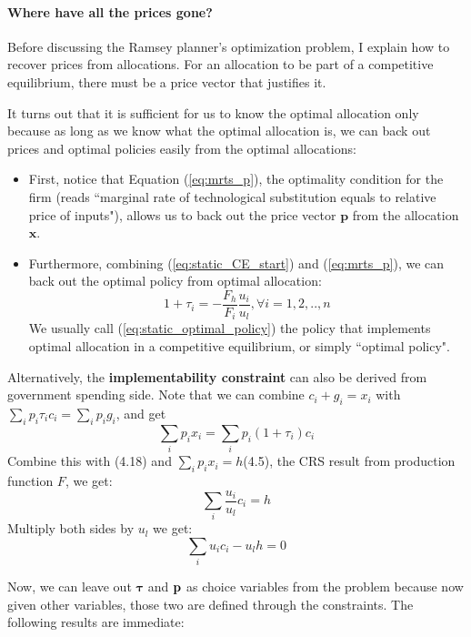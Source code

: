 \documentclass[12pt]{article}
\begin{document}
\paragraph{Where have all the prices gone?}
Before discussing the Ramsey planner's optimization problem, I explain how to recover prices from allocations. For an allocation to be part of a competitive equilibrium, there must be a price vector that justifies it. 

It turns out that it is sufficient for us to know the optimal allocation only because as long as we know what the optimal allocation is, we can back out prices and optimal policies easily from the optimal allocations:
\begin{itemize}
	\item First, notice that Equation (\ref{eq:mrts_p}), the optimality condition for the firm (reads ``marginal rate of technological substitution equals to relative price of inputs"), allows us to back out the price vector $\mathbf{p}$ from the allocation $\mathbf{x}$. 
	\item Furthermore, combining (\ref{eq:static_CE_start}) and (\ref{eq:mrts_p}), we can back out the optimal policy from optimal allocation:
	\begin{equation} \label{eq:static_optimal_policy}
		1 + \tau_i = -\frac{F_h}{F_i}\frac{u_i}{u_l}, \forall i = 1, 2, .., n
	\end{equation}
	We usually call (\ref{eq:static_optimal_policy}) the policy that implements optimal allocation in a competitive equilibrium, or simply ``optimal policy".
\end{itemize}

	
	Alternatively, the \textbf{implementability constraint} can also be derived from government spending side. Note that we can combine $c_i + g_i = x_i$ with $\sum_i p_i\tau_i c_i = \sum_{i} p_i g_i$, and get
	\begin{equation*}
		\sum_{i}p_i x_i = \sum_{i}p_i (1+\tau_i) c_i
	\end{equation*}
	Combine this with (4.18) and $\sum_i p_i x_i = h$(4.5), the CRS result from production function $F$, we get:
	\begin{equation*}
		\sum_i \frac{u_i}{u_l} c_i = h
	\end{equation*}
	Multiply both sides by $u_l$ we get:
	\begin{equation*}
		\sum_i u_i c_i - u_l h = 0
	\end{equation*}
	
	\noindent
	Now, we can leave out $\boldsymbol{\tau}$ and $\bold{p}$ as choice variables from the problem because now given other variables, those two are defined through the constraints. The following results are immediate:
	
\end{document}
